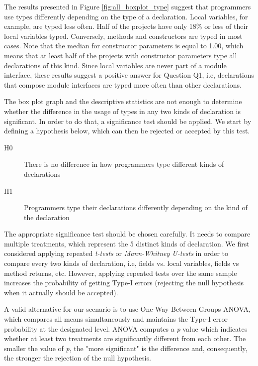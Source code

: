 \documentclass[]{sigplanconf}
\begin{document}
The results presented in Figure \ref{fig:all_boxplot_type} suggest that programmers use types differently depending on the type of a declaration.
Local variables, for example, are typed less often.
Half of the projects have only 18\% or less of their local variables typed.
Conversely, methods and constructors are typed in most cases.
Note that the median for constructor parameters is equal to 1.00, which means that at least half of the projects with constructor parameters type all declarations of this kind.
Since local variables are never part of a module interface, these results suggest a positive answer for Question Q1, i.e, declarations that compose module interfaces are typed more often than other declarations.

The box plot graph and the descriptive statistics are not enough to determine whether the difference in the usage of types in any two kinds of declaration is significant.
In order to do that, a significance test should be applied. 
We start by defining a hypothesis below, which can then be rejected or accepted by this test.

\begin{description}
\item[H0] There is no difference in how programmers type different kinds of declarations
\item[H1] Programmers type their declarations differently depending on the kind of the declaration
\end{description}

The appropriate significance test should be chosen carefully.
It needs to compare multiple treatments, which represent the 5 distinct kinds of declaration.
We first considered applying repeated \emph{t-tests} or \emph{Mann-Whitney U-tests} in order to compare every two kinds of declaration, i.e, fields vs. local variables, fields vs method returns, etc.
However, applying repeated tests over the same sample increases the probability of getting Type-I errors (rejecting the null hypothesis when it actually should be accepted).

A valid alternative for our scenario is to use One-Way Between Groups ANOVA, which compares all means simultaneously and maintains the Type-I error probability at the designated level.
ANOVA computes a \emph{p} value which indicates whether at least two treatments are significantly different from each other.
The smaller the value of \emph{p}, the "more significant" is the difference and, consequently, the stronger the rejection of the null hypothesis.
\end{document}
